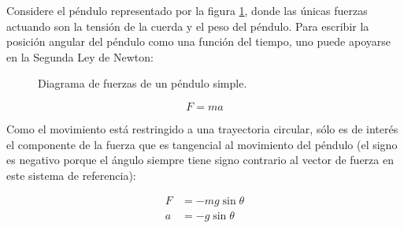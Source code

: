 \begin{ex}

    Considere el péndulo representado por la figura \ref{fig:pendulo}, donde
    las únicas fuerzas actuando son la tensión de la cuerda y el peso del
    péndulo. Para escribir la posición angular del péndulo como una función del
    tiempo, uno puede apoyarse en la Segunda Ley de Newton:

    \begin{figure}
        \centering
        \caption{Diagrama de fuerzas de un péndulo simple.}
        \label{fig:pendulo}
    \end{figure}

    \begin{equation*}
        F = ma
    \end{equation*}

    Como el movimiento está restringido a una trayectoria circular, sólo es de
    interés el componente de la fuerza que es tangencial al movimiento del
    péndulo (el signo es negativo porque el ángulo siempre tiene signo
    contrario al vector de fuerza en este sistema de referencia):

    \begin{align*}
        F &= -mg \sin \theta\\
        a &= -g \sin \theta\\
    \end{align*}


\end{ex}
